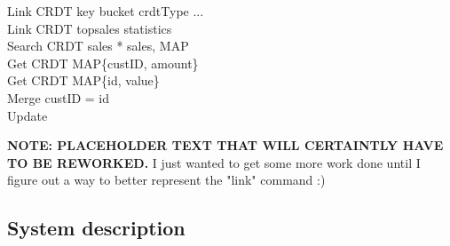 \documentclass{vldb}
\begin{document}
Link CRDT key bucket crdtType ...
\\
Link CRDT topsales statistics \\
	Search CRDT sales * sales, MAP \\
	Get CRDT MAP\{custID, amount\} \\
	Get CRDT MAP\{id, value\} \\
	Merge custID = id \\
	Update 
	

\textbf{NOTE: PLACEHOLDER TEXT THAT WILL CERTAINTLY HAVE TO BE REWORKED.} I just wanted to get some more work done until I figure out a way to better represent the "link" command :)



\subsection{System description}



\null\newpage\null

\null\newpage\null
\end{document}
